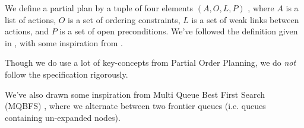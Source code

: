 \documentclass[Main]{subfiles}
\begin{document}


We define a partial plan by a tuple of four elements $(A,O,L,P)$ \citep{Weld1994}\citep{Russell2003}, where $A$ is a list of actions, $O$ is a set of ordering constraints, $L$ is a set of weak links between actions, and $P$ is a set of open preconditions. 
We've followed the definition given in \cite{Russell2003}, with some inspiration from \cite{Weld1994}.

Though we do use a lot of key-concepts from Partial Order Planning, we do \textit{not} follow the specification rigorously.

We've also drawn some inspiration from Multi Queue Best First Search (MQBFS) \citep[p.~38]{hector2013a}, where we alternate between two frontier queues (i.e. queues containing un-expanded nodes).


\end{document}
